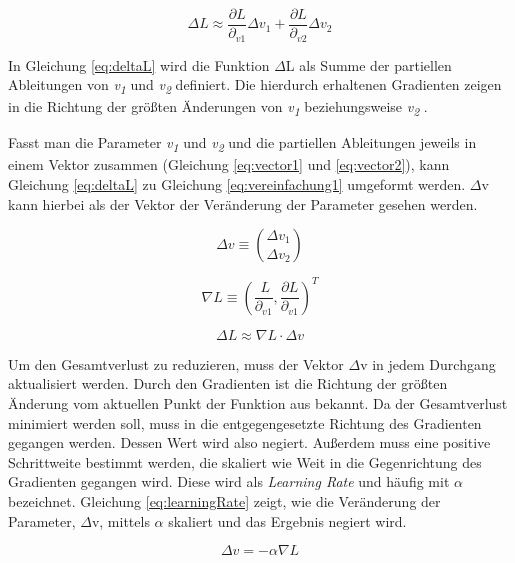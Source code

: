 \begin{equation} \label{eq:deltaL}
    \Delta L \approx \frac{\partial L}{\partial_{v1}} \Delta v_{1} + \frac{\partial L}{\partial_{v2}} \Delta v_{2}
\end{equation}

In Gleichung \ref{eq:deltaL} wird die Funktion $\Delta$L als Summe der partiellen Ableitungen von \textit{v\textsubscript{1}} und \textit{v\textsubscript{2}} definiert. Die hierdurch erhaltenen Gradienten zeigen in die Richtung der größten Änderungen von \textit{v\textsubscript{1}} beziehungsweise \textit{v\textsubscript{2}} .

Fasst man die Parameter \textit{v\textsubscript{1}} und \textit{v\textsubscript{2}} und die partiellen Ableitungen jeweils in einem Vektor zusammen (Gleichung \ref{eq:vector1} und \ref{eq:vector2}), kann Gleichung \ref{eq:deltaL} zu Gleichung \ref{eq:vereinfachung1} umgeformt werden. $\Delta$v kann hierbei als der Vektor der Veränderung der Parameter gesehen werden.

\begin{equation} \label{eq:vector1} 
    \Delta v \equiv \binom{\Delta v_{1}}{ \Delta v_{2}}
\end{equation}

\begin{equation} \label{eq:vector2}
    \nabla L \equiv (\frac{\     L}{\partial_{v1}},  \frac{\partial L}{\partial_{v1}})^{T}
\end{equation}

\begin{equation} \label{eq:vereinfachung1}
    \Delta L \approx \nabla L \cdot \Delta v
\end{equation}

Um den Gesamtverlust zu reduzieren, muss der Vektor $\Delta$v in jedem Durchgang aktualisiert werden. Durch den Gradienten ist die Richtung der größten Änderung vom aktuellen Punkt der Funktion aus bekannt. Da der Gesamtverlust minimiert werden soll, muss in die entgegengesetzte Richtung des Gradienten gegangen werden. Dessen Wert wird also negiert. Außerdem muss eine positive Schrittweite bestimmt werden, die skaliert wie Weit in die Gegenrichtung des Gradienten gegangen wird. Diese wird als \textit{Learning Rate} und häufig mit $\alpha$ bezeichnet. Gleichung \ref{eq:learningRate} zeigt, wie die Veränderung der Parameter, $\Delta$v, mittels $\alpha$ skaliert und das Ergebnis negiert wird.

\begin{equation} \label{eq:learningRate}
    \Delta v = -\alpha \nabla L
\end{equation}      

